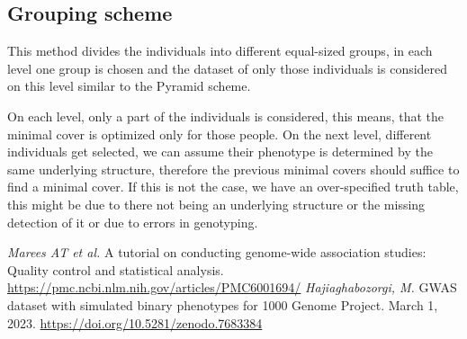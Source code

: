 \documentclass[letterpaper, 11pt]{article}
\begin{document}
\subsection{Grouping scheme}
This method divides the individuals into different equal-sized groups, in each level one group is chosen and the dataset of only those individuals is considered on this level similar to the Pyramid scheme. 

On each level, only a part of the individuals is considered, this means, that the minimal cover is optimized only for those people. On the next level, different individuals get selected, we can assume their phenotype is determined by the same underlying structure, therefore the previous minimal covers should suffice to find a minimal cover. If this is not the case, we have an over-specified truth table, this might be due to there not being an underlying structure or the missing detection of it or due to errors in genotyping. 
\begin{figure} [!h] 
\end{figure}



\newpage
\begin{thebibliography}{99}
\emph{Marees AT et al. } A tutorial on conducting genome-wide association studies: Quality control and statistical analysis. \url{https://pmc.ncbi.nlm.nih.gov/articles/PMC6001694/}
\emph{Hajiaghabozorgi, M. } GWAS dataset with simulated binary phenotypes for 1000 Genome Project. March 1, 2023. \url{https://doi.org/10.5281/zenodo.7683384}
\end{thebibliography}
\end{document}
